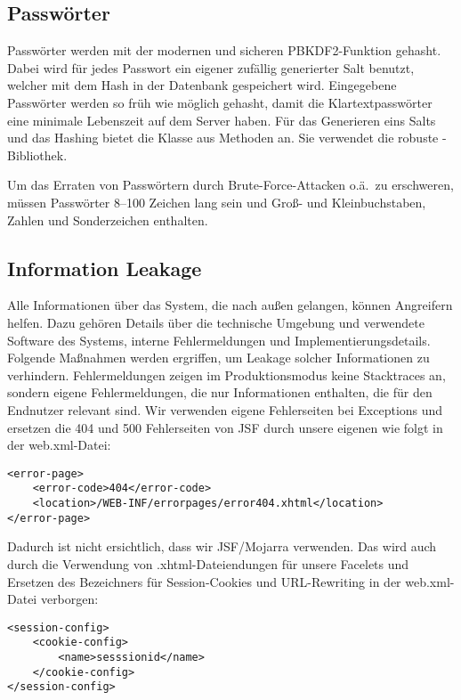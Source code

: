 \subsection{Passwörter}\label{subsec:passwords}
Passwörter werden mit der modernen und sicheren PBKDF2-Funktion gehasht.
Dabei wird für jedes Passwort ein eigener zufällig generierter Salt benutzt, welcher mit dem Hash in der Datenbank gespeichert wird.
Eingegebene Passwörter werden so früh wie möglich gehasht, damit die Klartextpasswörter eine minimale Lebenszeit auf dem Server haben.
Für das Generieren eins Salts und das Hashing bietet die Klasse  aus 
Methoden an.
Sie verwendet die robuste -Bibliothek.

Um das Erraten von Passwörtern durch Brute-Force-Attacken o.ä.\ zu erschweren, müssen Passwörter 8--100 Zeichen lang sein und Groß- und Kleinbuchstaben, Zahlen und Sonderzeichen enthalten.

\subsection{Information Leakage}\label{subsec:information-leakage}
Alle Informationen über das System, die nach außen gelangen, können Angreifern helfen.
Dazu gehören Details über die technische Umgebung und verwendete Software des Systems, interne Fehlermeldungen und Implementierungsdetails.
Folgende Maßnahmen werden ergriffen, um Leakage solcher Informationen zu verhindern.
Fehlermeldungen zeigen im Produktionsmodus keine Stacktraces an, sondern eigene Fehlermeldungen, die nur Informationen enthalten, die für den Endnutzer relevant sind.
Wir verwenden eigene Fehlerseiten bei Exceptions und ersetzen die 404 und 500 Fehlerseiten von JSF durch unsere eigenen wie folgt in der web.xml-Datei:
    {\small
\begin{lstlisting}
<error-page>
    <error-code>404</error-code>
    <location>/WEB-INF/errorpages/error404.xhtml</location>
</error-page>
\end{lstlisting}
}
Dadurch ist nicht ersichtlich, dass wir JSF/Mojarra verwenden.
Das wird auch durch die Verwendung von .xhtml-Dateiendungen für unsere Facelets und Ersetzen des Bezeichners  für Session-Cookies und URL-Rewriting in der web.xml-Datei verborgen:
    {\small
\begin{lstlisting}
<session-config>
    <cookie-config>
        <name>sesssionid</name>
    </cookie-config>
</session-config>
\end{lstlisting}
}

